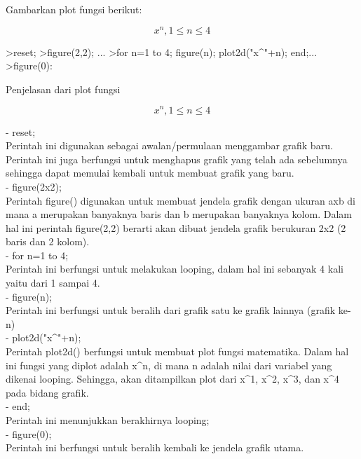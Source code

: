 \documentclass{article}
\begin{document}
\begin{eulernotebook}
\begin{eulercomment}
Gambarkan plot fungsi berikut:\\
\end{eulercomment}
\begin{eulerformula}
\[
x^n, 1 \leq n \leq 4
\]
\end{eulerformula}
\begin{eulerprompt}
>reset; 
>figure(2,2); ...
>for n=1 to 4; figure(n); plot2d("x^"+n); end;...
>figure(0):
\end{eulerprompt}
\begin{eulercomment}
Penjelasan dari plot fungsi\\
\end{eulercomment}
\begin{eulerformula}
\[
x^n, 1 \leq n \leq 4
\]
\end{eulerformula}
\begin{eulercomment}
- reset;\\
Perintah ini digunakan sebagai awalan/permulaan menggambar grafik
baru. Perintah ini juga berfungsi untuk menghapus grafik yang telah
ada sebelumnya sehingga dapat memulai kembali untuk membuat grafik
yang baru.\\
- figure(2x2);\\
Perintah figure() digunakan untuk membuat jendela grafik dengan ukuran
axb di mana a merupakan banyaknya baris dan b merupakan banyaknya
kolom. Dalam hal ini perintah figure(2,2) berarti akan dibuat jendela
grafik berukuran 2x2 (2 baris dan 2 kolom).\\
- for n=1 to 4;\\
Perintah ini berfungsi untuk melakukan looping, dalam hal ini sebanyak
4 kali yaitu dari 1 sampai 4.\\
- figure(n);\\
Perintah ini berfungsi untuk beralih dari grafik satu ke grafik
lainnya (grafik ke-n)\\
- plot2d("x\textasciicircum{}"+n);\\
Perintah plot2d() berfungsi untuk membuat plot fungsi matematika.
Dalam hal ini fungsi yang diplot adalah x\textasciicircum{}n, di mana n adalah nilai
dari variabel yang dikenai looping. Sehingga, akan ditampilkan plot
dari x\textasciicircum{}1, x\textasciicircum{}2, x\textasciicircum{}3, dan x\textasciicircum{}4 pada bidang grafik.\\
- end;\\
Perintah ini menunjukkan berakhirnya looping;\\
- figure(0);\\
Perintah ini berfungsi untuk beralih kembali ke jendela grafik utama.


\end{eulercomment}
\end{eulernotebook}
\end{document}
